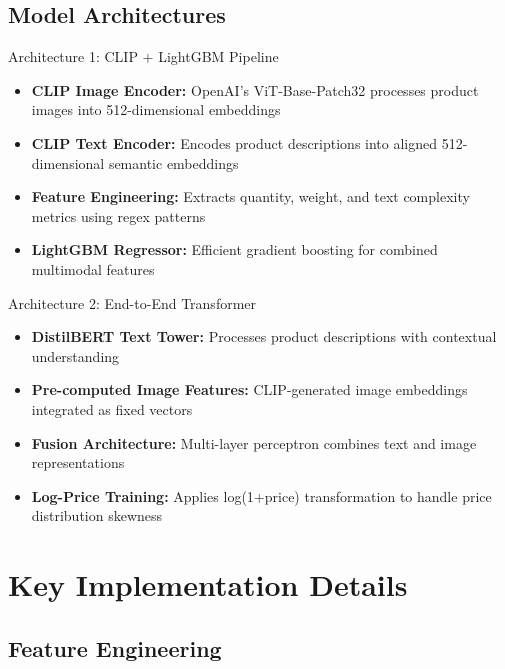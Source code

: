 \documentclass[10pt,a4paper]{article}
\begin{document}
\subsection{Model Architectures}

\begin{techbox}{Architecture 1: CLIP + LightGBM Pipeline}
\begin{itemize}[itemsep=0.2em]
    \item \textbf{CLIP Image Encoder:} OpenAI's ViT-Base-Patch32 processes product images into 512-dimensional embeddings
    \item \textbf{CLIP Text Encoder:} Encodes product descriptions into aligned 512-dimensional semantic embeddings  
    \item \textbf{Feature Engineering:} Extracts quantity, weight, and text complexity metrics using regex patterns
    \item \textbf{LightGBM Regressor:} Efficient gradient boosting for combined multimodal features
\end{itemize}
\end{techbox}

\vspace{0.3cm}

\begin{techbox}{Architecture 2: End-to-End Transformer}
\begin{itemize}[itemsep=0.2em]
    \item \textbf{DistilBERT Text Tower:} Processes product descriptions with contextual understanding
    \item \textbf{Pre-computed Image Features:} CLIP-generated image embeddings integrated as fixed vectors
    \item \textbf{Fusion Architecture:} Multi-layer perceptron combines text and image representations
    \item \textbf{Log-Price Training:} Applies log(1+price) transformation to handle price distribution skewness
\end{itemize}
\end{techbox}

\section{\textcolor{primarycolor}{Key Implementation Details}}

\subsection{Feature Engineering}
\end{document}

